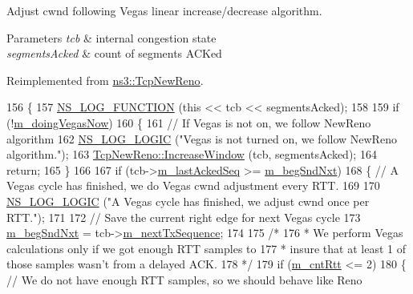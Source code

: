 Adjust cwnd following Vegas linear increase/decrease algorithm. 


\begin{DoxyParams}{Parameters}
{\em tcb} & internal congestion state \\
\hline
{\em segments\+Acked} & count of segments A\+C\+Ked \\
\hline
\end{DoxyParams}


Reimplemented from \hyperlink{classns3_1_1TcpNewReno_a11db8ae90f4cebacc15524a793b0741a}{ns3\+::\+Tcp\+New\+Reno}.


\begin{DoxyCode}
156 \{
157   \hyperlink{log-macros-disabled_8h_a90b90d5bad1f39cb1b64923ea94c0761}{NS\_LOG\_FUNCTION} (\textcolor{keyword}{this} << tcb << segmentsAcked);
158 
159   \textcolor{keywordflow}{if} (!\hyperlink{classns3_1_1TcpVegas_a8207740cdef670e55f31d067baf10c06}{m\_doingVegasNow})
160     \{
161       \textcolor{comment}{// If Vegas is not on, we follow NewReno algorithm}
162       \hyperlink{group__logging_ga88acd260151caf2db9c0fc84997f45ce}{NS\_LOG\_LOGIC} (\textcolor{stringliteral}{"Vegas is not turned on, we follow NewReno algorithm."});
163       \hyperlink{classns3_1_1TcpNewReno_a11db8ae90f4cebacc15524a793b0741a}{TcpNewReno::IncreaseWindow} (tcb, segmentsAcked);
164       \textcolor{keywordflow}{return};
165     \}
166 
167   \textcolor{keywordflow}{if} (tcb->\hyperlink{classns3_1_1TcpSocketState_a7a30ba2b675238429c7fe2f0c8d1ce94}{m\_lastAckedSeq} >= \hyperlink{classns3_1_1TcpVegas_affe4c208f73217f8f29380b91d287ed8}{m\_begSndNxt})
168     \{ \textcolor{comment}{// A Vegas cycle has finished, we do Vegas cwnd adjustment every RTT.}
169 
170       \hyperlink{group__logging_ga88acd260151caf2db9c0fc84997f45ce}{NS\_LOG\_LOGIC} (\textcolor{stringliteral}{"A Vegas cycle has finished, we adjust cwnd once per RTT."});
171 
172       \textcolor{comment}{// Save the current right edge for next Vegas cycle}
173       \hyperlink{classns3_1_1TcpVegas_affe4c208f73217f8f29380b91d287ed8}{m\_begSndNxt} = tcb->\hyperlink{classns3_1_1TcpSocketState_ad1f77b1cbdb9267a89ebb6f16ac76892}{m\_nextTxSequence};
174 
175       \textcolor{comment}{/*}
176 \textcolor{comment}{       * We perform Vegas calculations only if we got enough RTT samples to}
177 \textcolor{comment}{       * insure that at least 1 of those samples wasn't from a delayed ACK.}
178 \textcolor{comment}{       */}
179       \textcolor{keywordflow}{if} (\hyperlink{classns3_1_1TcpVegas_a4149c239657ba2ea7399374ec0fd9682}{m\_cntRtt} <= 2)
180         \{  \textcolor{comment}{// We do not have enough RTT samples, so we should behave like Reno}

\end{DoxyCode}
